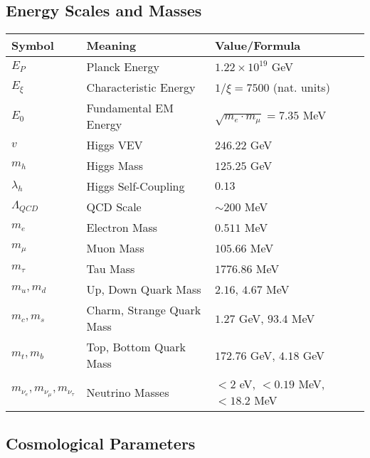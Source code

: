 \documentclass[12pt,a4paper]{article}
\begin{document}
	\subsection{Energy Scales and Masses}
	
	\begin{longtable}{lll}
		\toprule
		\textbf{Symbol} & \textbf{Meaning} & \textbf{Value/Formula} \\
		\midrule
		$E_P$ & Planck Energy & $1.22 \times 10^{19}$ GeV \\
		$E_\xi$ & Characteristic Energy & $1/\xi = 7500$ (nat. units) \\
		$E_0$ & Fundamental EM Energy & $\sqrt{m_e \cdot m_\mu} = 7.35$ MeV \\
		$v$ & Higgs VEV & $246.22$ GeV \\
		$m_h$ & Higgs Mass & $125.25$ GeV \\
		$\lambda_h$ & Higgs Self-Coupling & $0.13$ \\
		$\Lambda_{QCD}$ & QCD Scale & $\sim 200$ MeV \\
		$m_e$ & Electron Mass & $0.511$ MeV \\
		$m_\mu$ & Muon Mass & $105.66$ MeV \\
		$m_\tau$ & Tau Mass & $1776.86$ MeV \\
		$m_u, m_d$ & Up, Down Quark Mass & $2.16$, $4.67$ MeV \\
		$m_c, m_s$ & Charm, Strange Quark Mass & $1.27$ GeV, $93.4$ MeV \\
		$m_t, m_b$ & Top, Bottom Quark Mass & $172.76$ GeV, $4.18$ GeV \\
		$m_{\nu_e}, m_{\nu_\mu}, m_{\nu_\tau}$ & Neutrino Masses & $< 2$ eV, $< 0.19$ MeV, $< 18.2$ MeV \\
		\bottomrule
	\end{longtable}
	
	\subsection{Cosmological Parameters}
	
\end{document}
